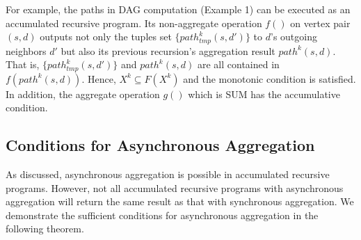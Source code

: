 
For example, the paths in DAG computation (Example 1) can be executed as an accumulated recursive program. Its non-aggregate operation $f()$ on vertex pair $(s,d)$ outputs not only the tuples set $\{path_{tmp}^k(s,d')\}$ to $d$'s outgoing neighbors $d'$ but also its previous recursion's aggregation result $path^k(s,d)$. That is, $\{path_{tmp}^k(s,d')\}$ and $path^k(s,d)$ are all contained in $f(path^k(s,d))$. Hence, $X^{k}\subseteq F(X^{k})$ and the monotonic condition is satisfied. In addition, the aggregate operation $g()$ which is SUM has the accumulative condition.



\subsection{Conditions for Asynchronous Aggregation}
\label{sec:async:condition}

As discussed, asynchronous aggregation is possible in accumulated recursive programs. However, not all accumulated recursive programs with asynchronous aggregation will return the same result as that with synchronous aggregation. We demonstrate the sufficient conditions for asynchronous aggregation in the following theorem.

